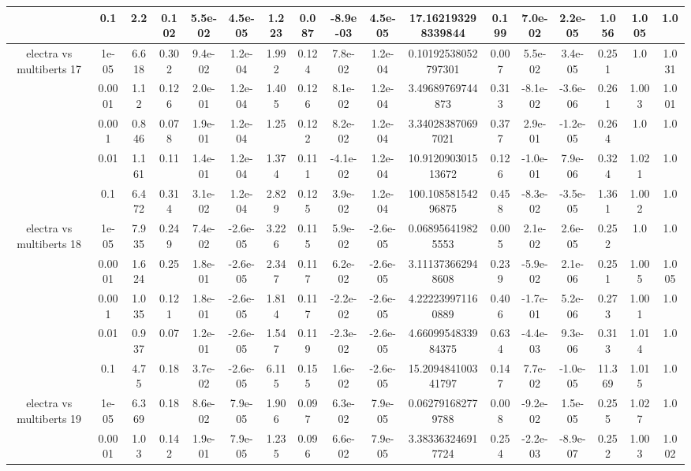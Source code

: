 \begin{tabular}{|c|c|c|c|c|c|c|c|c|c|c|c|c|c|c|c|c|}
 & 0.1 & 2.2 & 0.102 & 5.5e-02 & 4.5e-05 & 1.223 & 0.087 & -8.9e-03 & 4.5e-05 & 17.162193298339844 & 0.199 & 7.0e-02 & 2.2e-05 & 1.056 & 1.005 & 1.0 \\
\hline
\multirow{5}{*}{electra  vs multiberts 17} & 1e-05 & 6.618 & 0.302 & 9.4e-02 & 1.2e-04 & 1.992 & 0.124 & 7.8e-02 & 1.2e-04 & 0.10192538052797301 & 0.007 & 5.5e-02 & 3.4e-05 & 0.251 & 1.0 & 1.031 \\
 & 0.0001 & 1.12 & 0.126 & 2.0e-01 & 1.2e-04 & 1.405 & 0.126 & 8.1e-02 & 1.2e-04 & 3.49689769744873 & 0.313 & -8.1e-02 & -3.6e-06 & 0.261 & 1.003 & 1.001 \\
 & 0.001 & 0.846 & 0.078 & 1.9e-01 & 1.2e-04 & 1.25 & 0.122 & 8.2e-02 & 1.2e-04 & 3.340283870697021 & 0.377 & 2.9e-01 & -1.2e-05 & 0.264 & 1.0 & 1.0 \\
 & 0.01 & 1.161 & 0.11 & 1.4e-01 & 1.2e-04 & 1.374 & 0.111 & -4.1e-02 & 1.2e-04 & 10.912090301513672 & 0.126 & -1.0e-01 & 7.9e-06 & 0.324 & 1.021 & 1.0 \\
 & 0.1 & 6.472 & 0.314 & 3.1e-02 & 1.2e-04 & 2.829 & 0.125 & 3.9e-02 & 1.2e-04 & 100.10858154296875 & 0.458 & -8.3e-02 & -3.5e-05 & 1.361 & 1.002 & 1.0 \\
\hline
\multirow{5}{*}{electra  vs multiberts 18} & 1e-05 & 7.935 & 0.249 & 7.4e-02 & -2.6e-05 & 3.226 & 0.115 & 5.9e-02 & -2.6e-05 & 0.068956419825553 & 0.005 & 2.1e-02 & 2.6e-05 & 0.252 & 1.0 & 1.0 \\
 & 0.0001 & 1.624 & 0.25 & 1.8e-01 & -2.6e-05 & 2.347 & 0.117 & 6.2e-02 & -2.6e-05 & 3.111373662948608 & 0.239 & -5.9e-02 & 2.1e-06 & 0.251 & 1.005 & 1.005 \\
 & 0.001 & 1.035 & 0.121 & 1.8e-01 & -2.6e-05 & 1.814 & 0.117 & -2.2e-02 & -2.6e-05 & 4.222239971160889 & 0.406 & -1.7e-01 & 5.2e-06 & 0.273 & 1.001 & 1.0 \\
 & 0.01 & 0.937 & 0.07 & 1.2e-01 & -2.6e-05 & 1.547 & 0.119 & -2.3e-02 & -2.6e-05 & 4.6609954833984375 & 0.634 & -4.4e-03 & 9.3e-06 & 0.313 & 1.014 & 1.0 \\
 & 0.1 & 4.75 & 0.18 & 3.7e-02 & -2.6e-05 & 6.115 & 0.155 & 1.6e-02 & -2.6e-05 & 15.209484100341797 & 0.147 & 7.7e-02 & -1.0e-05 & 11.369 & 1.015 & 1.0 \\
\hline
\multirow{5}{*}{electra  vs multiberts 19} & 1e-05 & 6.369 & 0.18 & 8.6e-02 & 7.9e-05 & 1.906 & 0.097 & 6.3e-02 & 7.9e-05 & 0.062791682779788 & 0.008 & -9.2e-02 & 1.5e-05 & 0.255 & 1.027 & 1.0 \\
 & 0.0001 & 1.03 & 0.142 & 1.9e-01 & 7.9e-05 & 1.235 & 0.096 & 6.6e-02 & 7.9e-05 & 3.383363246917724 & 0.254 & -2.2e-03 & -8.9e-07 & 0.252 & 1.003 & 1.002 \\

\end{tabular}
